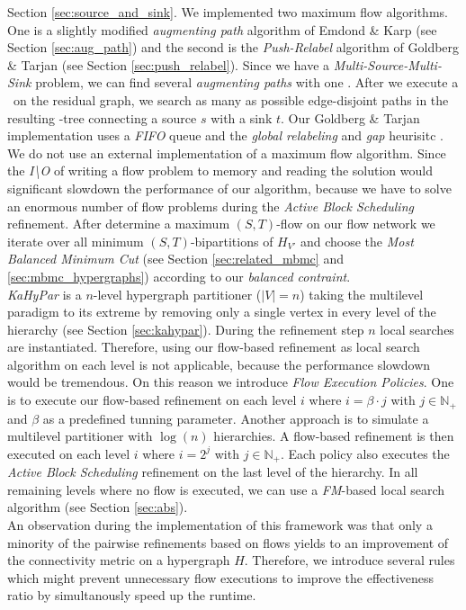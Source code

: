 Section \ref{sec:source_and_sink}. We implemented two maximum flow algorithms.
One is a slightly modified \emph{augmenting path} algorithm of Emdond \& Karp
\cite{edmonds1972theoretical} (see Section \ref{sec:aug_path}) 
and the second is the \emph{Push-Relabel} algorithm of
Goldberg \& Tarjan \cite{cherkassky1997implementing,goldberg1988new} 
(see Section \ref{sec:push_relabel}). Since we have a 
\emph{Multi-Source-Multi-Sink} problem, we can find several \emph{augmenting paths}
with one \BFS. After we execute a \BFS~on the residual graph, we search 
as many as possible edge-disjoint paths in the resulting \BFS-tree connecting a source $s$
with a sink $t$. Our Goldberg \& Tarjan implementation uses a \emph{FIFO} queue and
the \emph{global relabeling} and \emph{gap} heurisitc \cite{cherkassky1997implementing}.
We do not use an external implementation of a maximum flow algorithm.
Since the \emph{I\textbackslash O} of writing a flow problem to memory and reading the
solution would significant slowdown the performance of our algorithm, because we have
to solve an enormous number of flow problems during the \emph{Active Block Scheduling}
refinement. After determine a maximum $(S,T)$-flow on our flow network we iterate over
all minimum $(S,T)$-bipartitions of $H_{V'}$ \cite{picard1980structure} and choose 
the \emph{Most Balanced Minimum Cut} (see Section \ref{sec:related_mbmc} and 
\ref{sec:mbmc_hypergraphs}) according to our \emph{balanced contraint}. \\
\emph{KaHyPar} is a $n$-level hypergraph partitioner ($|V| = n$) taking the 
multilevel paradigm to its extreme by removing only a single vertex in every level
of the hierarchy \cite{akhremtsev2017engineering} (see Section \ref{sec:kahypar}). 
During the refinement step $n$ local searches are instantiated. Therefore, 
using our flow-based refinement as local search algorithm on each level is not 
applicable, because the performance slowdown would be tremendous. On this
reason we introduce \emph{Flow Execution Policies}. One is to execute our flow-based
refinement on each level $i$ where $i = \beta\cdot j$ with $j \in \mathbb{N}_+$ and
$\beta$ as a predefined tunning parameter. Another approach is to simulate a
multilevel partitioner with $\log(n)$ hierarchies. A flow-based refinement is then
executed on each level $i$ where $i = 2^j$ with $j \in \mathbb{N}_+$. Each policy also
executes the \emph{Active Block Scheduling} refinement on the last level of the
hierarchy. In all remaining levels where no flow is executed, we can use a 
\emph{FM}-based local search algorithm 
\cite{akhremtsev2017engineering,fiduccia1988linear,sanchis1989multiple} (see Section 
\ref{sec:abs}). \\
An observation during the implementation of this framework was that only a minority
of the pairwise refinements based on flows yields to an improvement of the connectivity
metric on a hypergraph $H$. Therefore, we introduce several rules which might prevent
unnecessary flow executions to improve the effectiveness ratio by simultanously speed up
the runtime.

